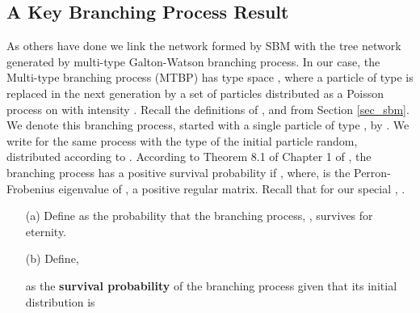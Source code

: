 \documentclass[graybox]{svmult}
\begin{document}
\subsection{A Key Branching Process Result}
\label{sec_br_proc}
As others have done we link the network formed by SBM with the tree network generated by multi-type Galton-Watson branching process. In our case, the Multi-type branching process (MTBP) has type space , where a particle of type  is replaced in the next generation by a set of particles distributed as a Poisson process on  with intensity . Recall the definitions of ,  and  from Section \ref{sec_sbm}. We denote this branching process, started with a single particle of type , by . We write  for the same process with the type of the initial particle random, distributed according to . According to Theorem 8.1 of Chapter 1 of \cite{mode1971multitype}, the branching process has a positive survival probability if , where,  is the Perron-Frobenius eigenvalue of , a positive regular matrix. Recall that for our special , .

\begin{definition}
\label{def_survival_prob}
\begin{itemize}
\item[(a)] Define  as the probability that the branching process, , survives for eternity. 
\item[(b)] Define,

as the \textbf{survival probability} of the branching process  given that its initial distribution is 
\end{itemize}
\end{definition}
\end{document}
